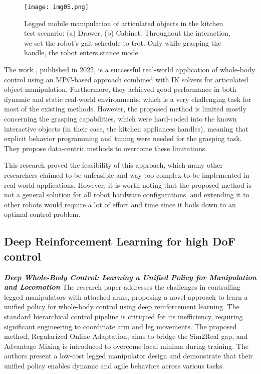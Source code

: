 \begin{figure}[t]
	\centering
	\texttt{[image: img05.png]}
	\captionsetup{width=1\linewidth}
	\caption{Legged mobile manipulation of articulated objects in the kitchen test scenario:
		(a) Drawer, (b) Cabinet. Throughout the interaction, we set the robot's gait schedule
		to trot. Only while grasping the handle, the robot enters stance mode.
		\cite{mittal2022articulated}}
	\label{fig:img05}
\end{figure}


The work \cite{mittal2022articulated}, published in 2022, is a successful real-world application
of whole-body control using an MPC-based approach
combined with IK solvers for articulated object manipulation.
Furthermore, they achieved good performance in both dynamic
and static real-world environments, which is a very challenging task for most of the
existing methods. However, the proposed method is limited mostly concerning the grasping
capabilities, which were hard-coded into the known interactive objects (in their case,
the kitchen appliances handles), meaning that explicit behavior programming and tuning were
needed for the grasping task. They propose data-centric methods to overcome these limitations.

This research proved the feasibility of this approach, which many other researchers claimed
to be unfeasible and way too complex to be implemented in real-world applications. However,
it is worth noting that the proposed method is not a general solution for all robot hardware
configurations, and extending it to other robots would require a lot of effort and time
since it boils down to an optimal control problem.

\subsection{Deep Reinforcement Learning for high DoF control}

\textbf{\textit{Deep Whole-Body Control: Learning a Unified Policy
		for Manipulation and Locomotion}} \quad
The research paper \cite{fu2022deeplegged} addresses the challenges in controlling legged
manipulators with attached arms, proposing a novel approach to learn a unified policy for
whole-body control using deep reinforcement learning. The standard hierarchical control pipeline
is critiqued for its inefficiency, requiring significant engineering to coordinate
arm and leg movements. The proposed method, Regularized Online Adaptation, aims to bridge the Sim2Real gap,
and Advantage Mixing is introduced to overcome local minima during training.
The authors present a low-cost legged manipulator design and demonstrate that their
unified policy enables dynamic and agile behaviors across various tasks.


